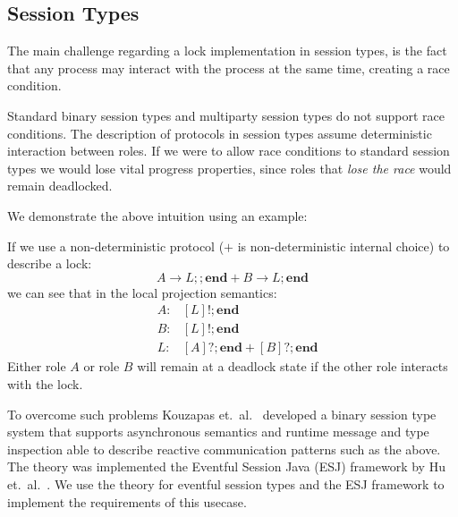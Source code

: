 \subsection{Session Types}

The main challenge regarding a lock implementation
in session types, is the fact that any process may
interact with the process at the same time, creating 
a race condition.

Standard binary session types and multiparty session types
do not support race conditions. The description of
protocols in session types assume deterministic interaction
between roles. If we were to allow race conditions to standard
session types we would lose vital progress properties, since
roles that {\em lose the race} would remain deadlocked.

We demonstrate the above intuition using an example:

\newcommand{\val}[2]{\ensuremath{#1 \rightarrow #2;} }
\newcommand{\tinact}{\ensuremath{\mathbf{end}}}
\newcommand{\tout}[1]{\ensuremath{[#1]!;}}
\newcommand{\tinp}[1]{\ensuremath{[#1]?;}}

If we use a non-deterministic protocol ($+$ is non-deterministic internal choice)
to describe a lock:
\[
	\val{A}{L}; \tinact + \val{B}{L} \tinact
\]
we can see that in the local projection semantics:
\begin{eqnarray*}
	&A:& \tout{L} \tinact\\
	&B:& \tout{L} \tinact\\
	&L:& \tinp{A} \tinact + \tinp{B} \tinact
\end{eqnarray*}
Either role $A$ or role $B$ will remain at a deadlock state
if the other role interacts with the lock.


To overcome such problems Kouzapas et.~al.~\cite{KouzapasYHH13}
developed a binary session type system that supports asynchronous
semantics and runtime message and type inspection able to describe
reactive communication patterns such as the above. The theory
was implemented the Eventful Session Java (ESJ) framework
by Hu et.~al.~\cite{event}.
We use the theory for eventful session types and the ESJ framework
to implement the requirements of this usecase.
